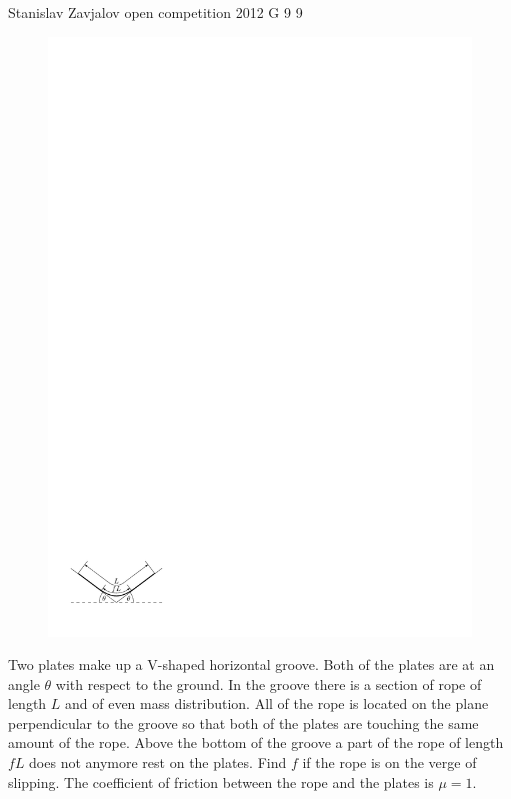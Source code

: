 \documentclass[11pt]{article}
\begin{document}
{Stanislav Zavjalov} %
{open competition} %
{2012} %
{G 9} %
{9} %
{

\ifEngStatement
\begin{figure}
\includegraphics[width=\linewidth]{2012-lahg-09-n88r_ipe}
\end{figure}
Two plates make up a V-shaped horizontal groove. Both of the plates are at an angle $\theta$ with respect to the ground. In the groove there is a section of rope of length $L$ and of even mass distribution. All of the rope is located on the plane perpendicular to the groove so that both of the plates are touching the same amount of the rope. Above the bottom of the groove a part of the rope of length $fL$ does not anymore rest on the plates. Find $f$ if the rope is on the verge of slipping. The coefficient of friction between the rope and the plates is $\mu = 1$.
\fi
}
\end{document}
